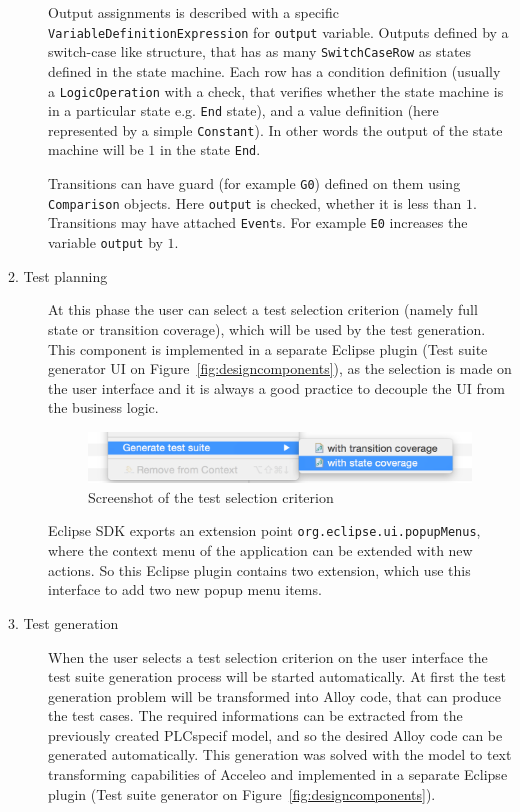 \begin{description}
	Output assignments is described with a specific \texttt{VariableDefinitionExpression} for \texttt{output} variable. Outputs defined by a switch-case like structure, that has as many \texttt{SwitchCaseRow} as states defined in the state machine. Each row has a condition definition (usually a \texttt{LogicOperation} with a check, that verifies whether the state machine is in a particular state e.g. \texttt{End} state), and a value definition (here represented by a simple \texttt{Constant}). In other words the output of the state machine will be $1$ in the state \texttt{End}.

	Transitions can have guard (for example \texttt{G0}) defined on them using \texttt{Comparison} objects. Here \texttt{output} is checked, whether it is less than $1$. Transitions may have attached \texttt{Event}s. For example \texttt{E0} increases the variable \texttt{output} by $1$.
	
	\item[2. Test planning] At this phase the user can select a test selection criterion (namely full state or transition coverage), which will be used by the test generation. This component is implemented in a separate Eclipse plugin (Test suite generator UI on Figure~\ref{fig:designcomponents}), as the selection is made on the user interface and it is always a good practice to decouple the UI from the business logic.
	
\begin{figure}[htp]
\centering
\includegraphics[scale=0.4]{figures/implementation_screenshot}
\caption{Screenshot of the test selection criterion}
\label{fig:implementation_screenshot}
\end{figure}
	
	Eclipse SDK exports an extension point \texttt{org.eclipse.ui.popupMenus}, where the context menu of the application can be extended with new actions. So this Eclipse plugin contains two extension, which use this interface to add two new popup menu items.
	
	\item[3. Test generation] When the user selects a test selection criterion on the user interface the test suite generation process will be started automatically. At first the test generation problem will be transformed into Alloy code, that can produce the test cases. The required informations can be extracted from the previously created PLCspecif model, and so the desired Alloy code can be generated automatically. This generation was solved with the model to text transforming capabilities of Acceleo and implemented in a separate Eclipse plugin (Test suite generator on Figure~\ref{fig:designcomponents}).
	

\end{description}
